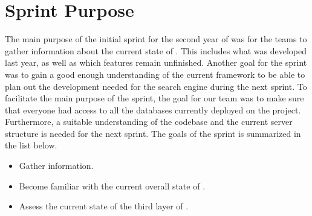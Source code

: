 \section{Sprint Purpose}
The main purpose of the initial sprint for the second year of \knox{} was for the teams to gather information about the current state of \knox{}.
This includes what was developed last year, as well as which features remain unfinished. 
Another goal for the sprint was to gain a good enough understanding of the current framework to be able to plan out the development needed for the search engine during the next sprint. 
To facilitate the main purpose of the sprint, the goal for our team was to make sure that everyone had access to all the databases currently deployed on the \knox{} project. 
Furthermore, a suitable understanding of the codebase and the current server structure is needed for the next sprint.
The goals of the sprint is summarized in the list below.

\begin{itemize}
    \item Gather information.
    \item Become familiar with the current overall state of \knox{}.
    \item Assess the current state of the third layer of \knox{}.
\end{itemize}
